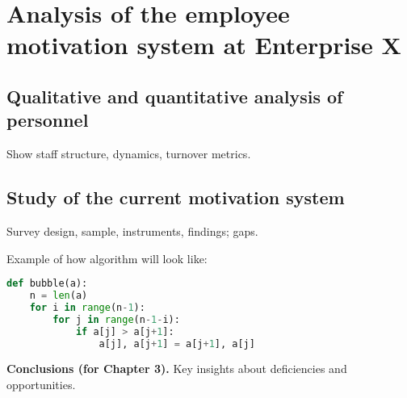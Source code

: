\chapter{Analysis of the employee motivation system at Enterprise X}
\section{Qualitative and quantitative analysis of personnel}
Show staff structure, dynamics, turnover metrics.

\section{Study of the current motivation system}
Survey design, sample, instruments, findings; gaps.

Example of how algorithm will look like:

\begin{lstlisting}[language=Python,caption={Bubble sort in Python},label={lst:bubble},float=htbp]
def bubble(a):
    n = len(a)
    for i in range(n-1):
        for j in range(n-1-i):
            if a[j] > a[j+1]:
                a[j], a[j+1] = a[j+1], a[j]
\end{lstlisting}


\noindent\textbf{Conclusions (for Chapter 3).} Key insights about deficiencies and opportunities.
